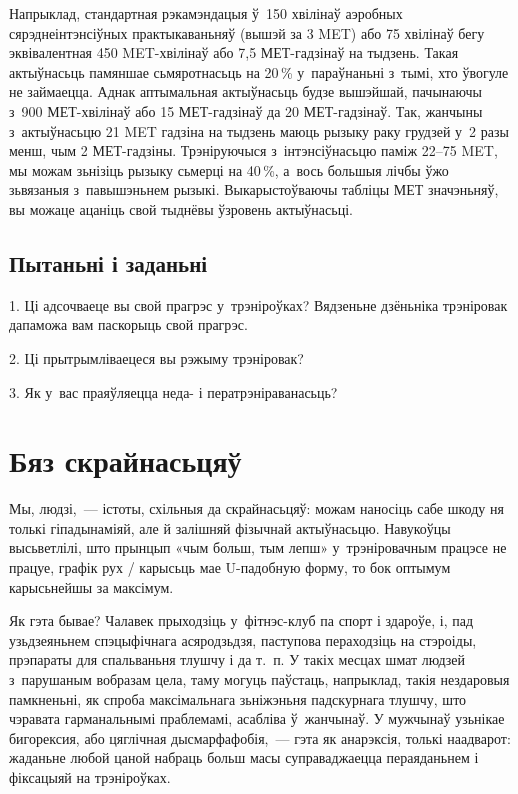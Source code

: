 Напрыклад, стандартная рэкамэндацыя ў~150 хвілінаў аэробных сярэднеінтэнсіўных практыкаваньняў (вышэй за 3 MET) або 75 хвілінаў бегу эквівалентная 450 MET-хвілінаў або 7,5 МЕТ-гадзінаў на тыдзень. Такая актыўнасьць памяншае сьмяротнасьць на 20\,\% у~параўнаньні з~тымі, хто ўвогуле не займаецца. Аднак аптымальная актыўнасьць будзе вышэйшай, пачынаючы з~900 МЕТ-хвілінаў або 15 МЕТ-гадзінаў да 20 МЕТ-гадзінаў. Так, жанчыны з~актыўнасьцю 21 MET гадзіна на тыдзень маюць рызыку раку грудзей у~2 разы менш, чым 2 МЕТ-гадзіны. Трэніруючыся з~інтэнсіўнасьцю паміж 22--75 MET, мы можам зьнізіць рызыку сьмерці на 40\,\%, а~вось большыя лічбы ўжо зьвязаныя з~павышэньнем рызыкі. Выкарыстоўваючы табліцы МЕТ значэньняў, вы можаце ацаніць свой тыднёвы ўзровень актыўнасьці.

\subsection*{Пытаньні і заданьні}

1. Ці адсочваеце вы свой прагрэс у~трэніроўках? Вядзеньне дзёньніка трэніровак дапаможа вам паскорыць свой прагрэс.

2. Ці прытрымліваецеся вы рэжыму трэніровак?

3. Як у~вас праяўляецца неда- і ператрэніраванасьць?


\section{Бяз скрайнасьцяў}

Мы, людзі,~--- істоты, схільныя да скрайнасьцяў: можам наносіць сабе шкоду ня толькі гіпадынаміяй, але й залішняй фізычнай актыўнасьцю. Навукоўцы высьветлілі, што прынцып «чым больш, тым лепш» у~трэніровачным працэсе не працуе, графік рух / карысьць мае U-падобную форму, то бок оптымум карысьнейшы за максімум.

Як гэта бывае? Чалавек прыходзіць у~фітнэс-клуб па спорт і здароўе, і, пад узьдзеяньнем спэцыфічнага асяродзьдзя, паступова пераходзіць на стэроіды, прэпараты для спальваньня тлушчу і да т.~п. У такіх месцах шмат людзей з~парушаным вобразам цела, таму могуць паўстаць, напрыклад, такія нездаровыя памкненьні, як спроба максімальнага зьніжэньня падскурнага тлушчу, што чэравата гарманальнымі праблемамі, асабліва ў~жанчынаў. У мужчынаў узьнікае бигорексия, або цяглічная дысмарфафобія,~--- гэта як анарэксія, толькі наадварот: жаданьне любой цаной набраць больш масы суправаджаецца пераяданьнем і фіксацыяй на трэніроўках.

